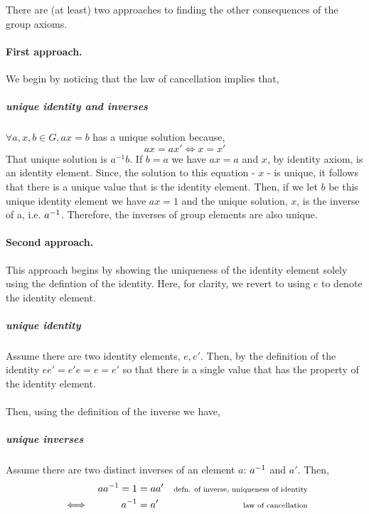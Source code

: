 \documentclass[MathsNotesBase.tex]{subfiles}
\begin{document}
{	\bigskip\bigskip
	There are (at least) two approaches to finding the other consequences of the group axioms.
	\paragraph*{First approach.} We begin by noticing that the law of cancellation implies that,
	\subparagraph*{unique identity and inverses}$\forall a,x,b \in G, ax = b$ has a unique solution because,
	\[ ax = ax' \iff x = x' \]
	That unique solution is $a^{-1}b$. If $b=a$ we have $ax=a$ and $x$, by identity axiom, is an identity element. Since, the solution to this equation - $x$ - is unique, it follows that there is a unique value that is the identity element. Then, if we let $b$ be this unique identity element we have $ax=1$ and the unique solution, $x$, is the inverse of a, i.e. ${a}^{-1}$. Therefore, the inverses of group elements are also unique.
	
	\paragraph*{Second approach.} This approach begins by showing the uniqueness of the identity element solely using the defintion of the identity. Here, for clarity, we revert to using $e$ to denote the identity element.
	\subparagraph*{unique identity} Assume there are two identity elements, $e, e'$. Then, by the definition of the identity $ee' = e'e = e = e'$ so that there is a single value that has the property of the identity element.\\\\
	Then, using the definition of the inverse we have,
	\subparagraph{unique inverses} Assume there are two distinct inverses of an element $a$: ${a}^{-1}$ and $a'$. Then, 
	\begin{align*}
	&& a{a}^{-1} = 1 &= aa' &\text{\scriptsize{defn. of inverse, uniqueness of identity}}\\
	& \iff & {a}^{-1} &= a' &\text{\scriptsize{law of cancellation}}
	\end{align*}
	\bigskip\bigskip

}
\end{document}

